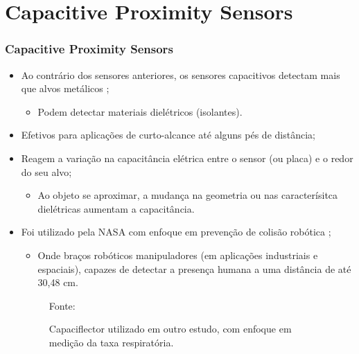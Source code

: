 \documentclass[xcolor=dvipsnames, aspectratio=169]{beamer}
\begin{document}
\section[Capacitive Proximity Sensors]{Capacitive Proximity Sensors} 
\begin{frame}
\frametitle{Capacitive Proximity Sensors}
	\begin{itemize}
		\item Ao contrário dos sensores anteriores, os sensores capacitivos detectam mais que alvos metálicos \cite{everett1995sensors};
		\begin{itemize}
			\item Podem detectar materiais dielétricos (isolantes).
		\end{itemize}
		\item Efetivos para aplicações de curto-alcance até alguns pés de distância;
		\item Reagem a variação na capacitância elétrica entre o sensor (ou placa) e o redor do seu alvo;
		\begin{itemize}
			\item Ao objeto se aproximar, a mudança na geometria ou nas caracterísitca dielétricas aumentam a capacitância.
		\end{itemize}
		\item Foi utilizado pela NASA com enfoque em prevenção de colisão robótica \cite{everett1995sensors};
		\begin{itemize}
			\item Onde braços robóticos manipuladores (em aplicações industriais e espaciais), capazes de detectar a presença humana a uma distância de até 30,48 cm.		\end{itemize}
		\begin{figure}
			\centering
			{Fonte: \cite{hayward2022capaciflector}}
			\caption{Capaciflector utilizado em outro estudo, com enfoque em medição da taxa respiratória.}
			\label{fig:6_capaciflector}
		\end{figure}
	\end{itemize}
\end{frame}
\end{document}
